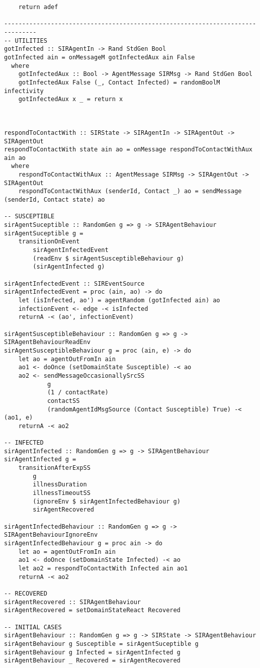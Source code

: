 \begin{verbatim}
    return adef
   
-------------------------------------------------------------------------------
-- UTILITIES
gotInfected :: SIRAgentIn -> Rand StdGen Bool
gotInfected ain = onMessageM gotInfectedAux ain False
  where
    gotInfectedAux :: Bool -> AgentMessage SIRMsg -> Rand StdGen Bool
    gotInfectedAux False (_, Contact Infected) = randomBoolM infectivity
    gotInfectedAux x _ = return x



respondToContactWith :: SIRState -> SIRAgentIn -> SIRAgentOut -> SIRAgentOut
respondToContactWith state ain ao = onMessage respondToContactWithAux ain ao
  where
    respondToContactWithAux :: AgentMessage SIRMsg -> SIRAgentOut -> SIRAgentOut
    respondToContactWithAux (senderId, Contact _) ao = sendMessage (senderId, Contact state) ao

-- SUSCEPTIBLE
sirAgentSuceptible :: RandomGen g => g -> SIRAgentBehaviour
sirAgentSuceptible g = 
	transitionOnEvent 
		sirAgentInfectedEvent 
		(readEnv $ sirAgentSusceptibleBehaviour g) 
		(sirAgentInfected g)

sirAgentInfectedEvent :: SIREventSource
sirAgentInfectedEvent = proc (ain, ao) -> do
    let (isInfected, ao') = agentRandom (gotInfected ain) ao
    infectionEvent <- edge -< isInfected
    returnA -< (ao', infectionEvent)

sirAgentSusceptibleBehaviour :: RandomGen g => g -> SIRAgentBehaviourReadEnv
sirAgentSusceptibleBehaviour g = proc (ain, e) -> do
    let ao = agentOutFromIn ain
    ao1 <- doOnce (setDomainState Susceptible) -< ao
    ao2 <- sendMessageOccasionallySrcSS 
    		g
    		(1 / contactRate)
    		contactSS
    		(randomAgentIdMsgSource (Contact Susceptible) True) -< (ao1, e)
    returnA -< ao2

-- INFECTED
sirAgentInfected :: RandomGen g => g -> SIRAgentBehaviour
sirAgentInfected g = 
	transitionAfterExpSS 
		g 
		illnessDuration 
		illnessTimeoutSS 
		(ignoreEnv $ sirAgentInfectedBehaviour g) 
		sirAgentRecovered

sirAgentInfectedBehaviour :: RandomGen g => g -> SIRAgentBehaviourIgnoreEnv
sirAgentInfectedBehaviour g = proc ain -> do
    let ao = agentOutFromIn ain
    ao1 <- doOnce (setDomainState Infected) -< ao
    let ao2 = respondToContactWith Infected ain ao1
    returnA -< ao2

-- RECOVERED
sirAgentRecovered :: SIRAgentBehaviour
sirAgentRecovered = setDomainStateReact Recovered

-- INITIAL CASES
sirAgentBehaviour :: RandomGen g => g -> SIRState -> SIRAgentBehaviour
sirAgentBehaviour g Susceptible = sirAgentSuceptible g
sirAgentBehaviour g Infected = sirAgentInfected g
sirAgentBehaviour _ Recovered = sirAgentRecovered


\end{verbatim}
